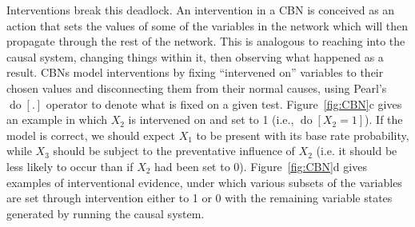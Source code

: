 \documentclass{cambridge7A}%
\newcommand{\sntodo}[2][]{\todo[caption={\textbf{NB}}, size=\footnotesize, color = aliceblue, #1]{#2}~}
\DeclareMathOperator*{\Do}{do}
\DeclareMathOperator*{\pa}{ca} %
\newcommand{\ww}{\mathbf{w}} %
\newcommand{\cald}{\mathcal{D}} %
\newcommand{\cali}{\mathcal{A}} %
\newcommand{\cm}{a} %
\newcommand{\dm}{d} %
\begin{document}
Interventions break this deadlock.  An intervention in a CBN is conceived as an action that sets the values of some of the variables in the network which will then propagate through the rest of the network.   This is analogous to reaching into the causal system, changing things within it, then observing what happened as a result. CBNs model interventions by fixing ``intervened on'' variables to their chosen values and disconnecting them from their normal causes, using Pearl's $\Do[.]$ operator \citep{pearl2000causality} to denote what is fixed on a given test.  Figure~\ref{fig:CBN}c gives an example in which $X_2$ is intervened on and set to 1 (i.e., $\Do[X_2=1]$).  If the model is correct, we should expect $X_1$ to be present with its base rate probability, while $X_3$ should be subject to the preventative influence of $X_2$ (i.e. it should be less likely to occur than if $X_2$ had been set to 0).  Figure~\ref{fig:CBN}d gives examples of interventional evidence, under which various subsets of the variables are set through intervention either to 1 or 0 with the remaining variable states generated by running the causal system.

\end{document}
